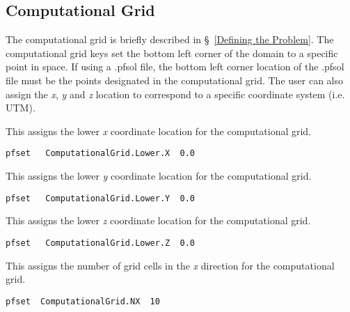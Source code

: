 
\subsection{Computational Grid}
\label{Computational Grid}

The computational grid is briefly described in \S~\ref{Defining the Problem}. The computational grid keys set
the bottom left corner of the domain to a specific point in space. If using
a .pfsol file, the bottom left corner location of the .pfsol file must be the points
designated in the computational grid. The user can also assign the \emph{x}, \emph{y}
and \emph{z} location to correspond to a specific coordinate system (i.e. UTM).

{This assigns the lower \emph{x} coordinate location for the computational grid.}
\begin{display}\begin{verbatim}
pfset   ComputationalGrid.Lower.X  0.0
\end{verbatim}\end{display}

{This assigns the lower \emph{y} coordinate location for the computational grid.}
\begin{display}\begin{verbatim}
pfset   ComputationalGrid.Lower.Y  0.0
\end{verbatim}\end{display}

{This assigns the lower \emph{z} coordinate location for the computational grid.}
\begin{display}\begin{verbatim}
pfset   ComputationalGrid.Lower.Z  0.0
\end{verbatim}\end{display}

{This assigns the number of grid cells in the \emph{x} direction for the computational grid.}
\begin{display}\begin{verbatim}
pfset  ComputationalGrid.NX  10
\end{verbatim}\end{display}

